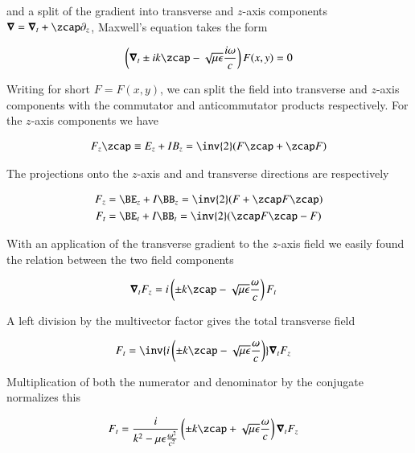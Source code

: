 and a split of the gradient into transverse and $z$-axis components $\spacegrad = \spacegrad_t + \zcap \partial_z$, Maxwell's equation takes the form

\begin{align}\label{eqn:transverseField:summaryMax2}
\left(\spacegrad_t \pm i k \zcap - \sqrt{\mu\epsilon}\frac{i\omega}{c}\right) F(x,y) = 0
\end{align}

Writing for short $F = F(x,y)$, we can split the field into transverse and $z$-axis components with the commutator and anticommutator products respectively.  For the $z$-axis components we have

\begin{align}\label{eqn:transverseField:foo4}
F_z \zcap \equiv E_z + I B_z = \inv{2} (F \zcap + \zcap F) 
\end{align}

The projections onto the $z$-axis and and transverse directions are respectively 

\begin{align}\label{eqn:transverseField:foo5}
F_z &= \BE_z + I \BB_z = \inv{2} (F + \zcap F \zcap) \\
F_t &= \BE_t + I \BB_t = \inv{2} (\zcap F \zcap - F)
\end{align}

With an application of the transverse gradient to the $z$-axis field we easily found the relation between the two field components

\begin{align}\label{eqn:transverseField:foo6}
\spacegrad_t F_z &= i \left( \pm k \zcap - \sqrt{\mu\epsilon}\frac{\omega}{c}\right) F_t
\end{align}

A left division by the multivector factor gives the total transverse field

\begin{align}\label{eqn:transverseField:foo7}
F_t &= \inv{i \left( \pm k \zcap - \sqrt{\mu\epsilon}\frac{\omega}{c}\right) } \spacegrad_t F_z 
\end{align}

Multiplication of both the numerator and denominator by the conjugate normalizes this

\begin{align}\label{eqn:transverseField:summaryTransverseBoth}
F_t &= \frac{i}{k^2 - \mu\epsilon\frac{\omega^2}{c^2}} \left( \pm k \zcap + \sqrt{\mu\epsilon}\frac{\omega}{c}\right) \spacegrad_t F_z
\end{align}

